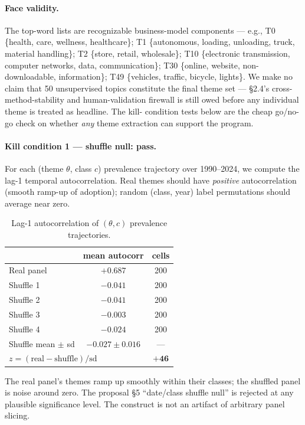 \documentclass[11pt]{report}
\begin{document}
\paragraph{Face validity.} The top-word lists are recognizable business-model
components --- e.g., T0 \{health, care, wellness, healthcare\}; T1 \{autonomous,
loading, unloading, truck, material handling\}; T2 \{store, retail, wholesale\};
T10 \{electronic transmission, computer networks, data, communication\}; T30
\{online, website, non-downloadable, information\}; T49 \{vehicles, traffic,
bicycle, lights\}. We make no claim that 50 unsupervised topics constitute the
final theme set --- §2.4's cross-method-stability and human-validation firewall
is still owed before any individual theme is treated as headline. The kill-
condition tests below are the cheap go/no-go check on whether \emph{any} theme
extraction can support the program.

\paragraph{Kill condition 1 --- shuffle null: pass.}
For each (theme $\theta$, class $c$) prevalence trajectory over 1990--2024, we
compute the lag-1 temporal autocorrelation. Real themes should have
\emph{positive} autocorrelation (smooth ramp-up of adoption); random
(class, year) label permutations should average near zero.

\begin{table}[h]\centering\small
\caption{Lag-1 autocorrelation of $(\theta, c)$ prevalence trajectories.}
\begin{tabular}{lcc}
\toprule
& mean autocorr & cells \\
\midrule
Real panel & $+0.687$ & 200 \\
Shuffle 1 & $-0.041$ & 200 \\
Shuffle 2 & $-0.041$ & 200 \\
Shuffle 3 & $-0.003$ & 200 \\
Shuffle 4 & $-0.024$ & 200 \\
\midrule
Shuffle mean $\pm$ sd & $-0.027 \pm 0.016$ & --- \\
\multicolumn{2}{l}{$z = (\text{real} - \text{shuffle})/\text{sd}$} & $\mathbf{+46}$ \\
\bottomrule
\end{tabular}
\end{table}

\noindent The real panel's themes ramp up smoothly within their classes; the
shuffled panel is noise around zero. The proposal §5 ``date/class shuffle null''
is rejected at any plausible significance level. The construct is not an
artifact of arbitrary panel slicing.
\end{document}
